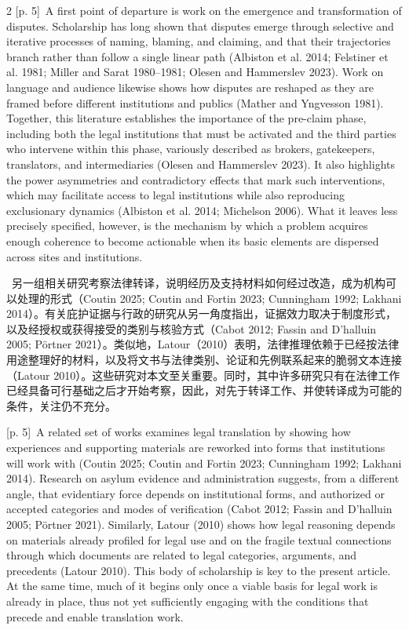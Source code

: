 \documentclass[10pt,a4paper]{article}
\begin{document}
\begin{paracol}{2}
{\scriptsize\color{gray} [p. 5]}\ A first point of departure is work on the emergence and transformation of disputes. Scholarship has long shown that disputes emerge through selective and iterative processes of naming, blaming, and claiming, and that their trajectories branch rather than follow a single linear path (Albiston et al. 2014; Felstiner et al. 1981; Miller and Sarat 1980–1981; Olesen and Hammerslev 2023). Work on language and audience likewise shows how disputes are reshaped as they are framed before different institutions and publics (Mather and Yngvesson 1981). Together, this literature establishes the importance of the pre-claim phase, including both the legal institutions that must be activated and the third parties who intervene within this phase, variously described as brokers, gatekeepers, translators, and intermediaries (Olesen and Hammerslev 2023). It also highlights the power asymmetries and contradictory effects that mark such interventions, which may facilitate access to legal institutions while also reproducing exclusionary dynamics (Albiston et al. 2014; Michelson 2006). What it leaves less precisely specified, however, is the mechanism by which a problem acquires enough coherence to become actionable when its basic elements are dispersed across sites and institutions.\par
\switchcolumn*
{\scriptsize\color{gray} [p. 5]}\ 另一组相关研究考察法律转译，说明经历及支持材料如何经过改造，成为机构可以处理的形式（Coutin 2025; Coutin and Fortin 2023; Cunningham 1992; Lakhani 2014）。有关庇护证据与行政的研究从另一角度指出，证据效力取决于制度形式，以及经授权或获得接受的类别与核验方式（Cabot 2012; Fassin and D’halluin 2005; Pörtner 2021）。类似地，Latour（2010）表明，法律推理依赖于已经按法律用途整理好的材料，以及将文书与法律类别、论证和先例联系起来的脆弱文本连接（Latour 2010）。这些研究对本文至关重要。同时，其中许多研究只有在法律工作已经具备可行基础之后才开始考察，因此，对先于转译工作、并使转译成为可能的条件，关注仍不充分。\par
\switchcolumn
{\scriptsize\color{gray} [p. 5]}\ A related set of works examines legal translation by showing how experiences and supporting materials are reworked into forms that institutions will work with (Coutin 2025; Coutin and Fortin 2023; Cunningham 1992; Lakhani 2014). Research on asylum evidence and administration suggests, from a different angle, that evidentiary force depends on institutional forms, and authorized or accepted categories and modes of verification (Cabot 2012; Fassin and D’halluin 2005; Pörtner 2021). Similarly, Latour (2010) shows how legal reasoning depends on materials already profiled for legal use and on the fragile textual connections through which documents are related to legal categories, arguments, and precedents (Latour 2010). This body of scholarship is key to the present article. At the same time, much of it begins only once a viable basis for legal work is already in place, thus not yet sufficiently engaging with the conditions that precede and enable translation work.\par

\end{paracol}
\end{document}
